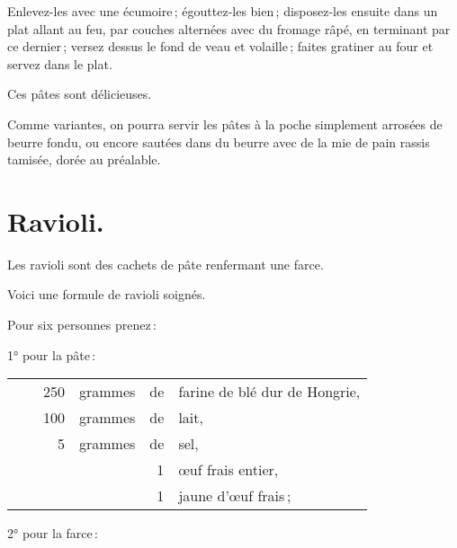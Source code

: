 Enlevez-les avec une écumoire ; égouttez-les bien ; disposez-les ensuite dans
un plat allant au feu, par couches alternées avec du fromage râpé, en terminant
par ce dernier ; versez dessus le fond de veau et volaille ; faites gratiner au
four et servez dans le plat.

Ces pâtes sont délicieuses.

\sk

Comme variantes, on pourra servir les pâtes à la poche simplement arrosées de
beurre fondu, ou encore sautées dans du beurre avec de la mie de pain rassis
tamisée, dorée au préalable.

\section*{\centering Ravioli.}
{}

Les ravioli sont des cachets de pâte renfermant une farce.

Voici une formule de ravioli soignés.

\medskip

Pour six personnes prenez :

\medskip

1° pour la pâte :

\footnotesize
\begin{longtable}{rrrrrp{18em}}
  & \hspace{2em} &  250 & grammes & de & farine de blé dur de Hongrie,                                    \\
  & \hspace{2em} &  100 & grammes & de & lait,                                                            \\
  & \hspace{2em} &    5 & grammes & de & sel,                                                             \\
  & \hspace{2em} &      &         &  1 & œuf frais entier,                                                \\
  & \hspace{2em} &      &         &  1 & jaune d'œuf frais ;                                              \\
\end{longtable}
\normalsize

2° pour la farce :

